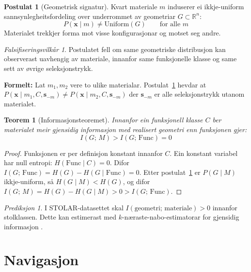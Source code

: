 \documentclass[11pt, a4paper]{article}
\theoremstyle{definition}
\newtheorem{postulat}[defn]{Postulat}
\theoremstyle{plain}
\newtheorem{teorem}[defn]{Teorem}
\theoremstyle{remark}
\newtheorem*{falsifisering}{Falsifiseringsvilk\aa r}
\newtheorem*{prediksjon}{Prediksjon}
\newcommand{\x}{\mathbf{x}}
\newcommand{\svec}{\mathbf{s}}
\newcommand{\Reals}{\mathbb{R}}
\begin{document}
\begin{postulat}[Geometrisk signatur]
\label{post:signatur}
Kvart materiale $m$ induserer ei ikkje-uniform sannsynlegheitsfordeling over
underrommet av geometriar $G \subset \Reals^n$:
\[
  P(\x \mid m) \neq \mathrm{Uniform}(G)
  \qquad \text{for alle } m
\]
Materialet trekkjer forma mot visse konfigurasjonar og motset seg andre.
\end{postulat}

\begin{falsifisering}
Postulatet fell om same geometriske distribusjon kan observerast uavhengig av materiale,
innanfor same funksjonelle klasse og same sett av \o vrige seleksjonstrykk.
\end{falsifisering}

\noindent\textbf{Formelt:}
Lat $m_1, m_2$ vere to ulike materialar.
Postulat~\ref{post:signatur} hevdar at
$P(\x \mid m_1, C, \svec_{-m}) \neq P(\x \mid m_2, C, \svec_{-m})$
der $\svec_{-m}$ er alle seleksjonstrykk utanom materialet.

\begin{teorem}[Informasjonsteoremet]
\label{teo:informasjon}
Innanfor ein funksjonell klasse $C$ ber materialet meir gjensidig informasjon med
realisert geometri enn funksjonen gjer:
\[
  I(G;\, M) > I(G;\, \mathrm{Func}) = 0
\]
\end{teorem}

\begin{proof}
Funksjonen er per definisjon konstant innanfor $C$.
Ein konstant variabel har null entropi: $H(\mathrm{Func} \mid C) = 0$.
Difor $I(G;\, \mathrm{Func}) = H(G) - H(G \mid \mathrm{Func}) = 0$.
Etter postulat~\ref{post:signatur} er $P(G \mid M)$ ikkje-uniform,
s\aa{} $H(G \mid M) < H(G)$, og difor
$I(G;\, M) = H(G) - H(G \mid M) > 0 > I(G;\, \mathrm{Func})$.
\end{proof}

\begin{prediksjon}
I STOLAR-datasettet skal $I(\text{geometri};\, \text{materiale}) > 0$ innanfor
stolklassen. Dette kan estimerast med $k$-n\ae raste-nabo-estimatorar for gjensidig
informasjon \citep{kraskov2004}.
\end{prediksjon}


\section{Navigasjon}
\label{sec:navigasjon}
\end{document}
